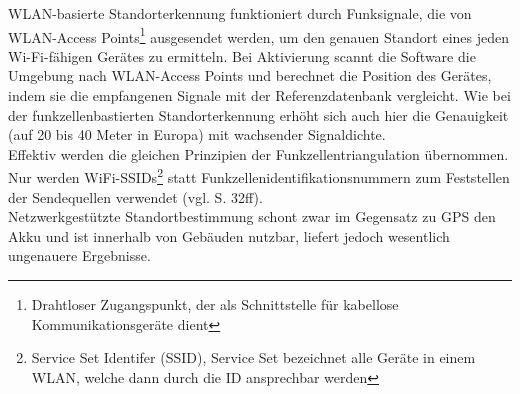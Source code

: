 \gls{WLAN}-basierte Standorterkennung funktioniert durch Funksignale, die von \gls{WLAN}-Access Points\footnote{ Drahtloser Zugangspunkt, der als Schnittstelle für kabellose Kommunikationsgeräte dient} ausgesendet werden, um den genauen Standort eines jeden Wi-Fi-fähigen Gerätes zu ermitteln. Bei Aktivierung scannt die Software die Umgebung nach \gls{WLAN}-Access Points und berechnet die Position des Gerätes, indem sie die empfangenen Signale mit der Referenzdatenbank vergleicht. Wie bei der funkzellenbastierten Standorterkennung erhöht sich auch hier die Genauigkeit (auf 20 bis 40 Meter in Europa) mit wachsender Signaldichte. \\
Effektiv werden die gleichen Prinzipien der Funkzellentriangulation übernommen. Nur werden WiFi-SSIDs\footnote{ Service Set Identifer (SSID), Service Set bezeichnet alle Geräte in einem \gls{WLAN}, welche dann durch die ID ansprechbar werden} statt Funkzellenidentifikationsnummern zum Feststellen der Sendequellen verwendet (vgl. \cite{gps} S. 32ff). \\
Netzwerkgestützte Standortbestimmung schont zwar im Gegensatz zu \gls{GPS} den Akku und ist innerhalb von Gebäuden nutzbar, liefert jedoch wesentlich ungenauere Ergebnisse.

